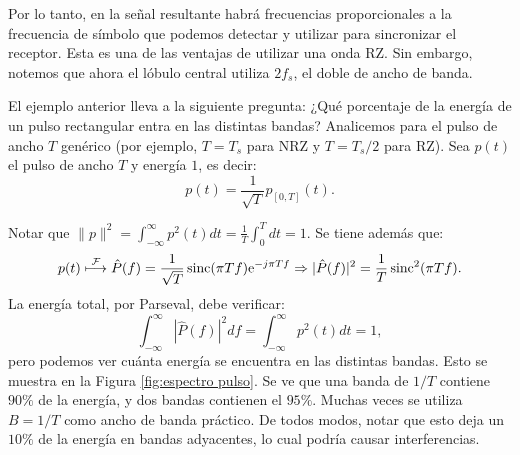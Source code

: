 \begin{ejemplo}
    Por lo tanto, en la señal resultante habrá frecuencias proporcionales a la frecuencia de símbolo que podemos detectar y utilizar para sincronizar el receptor. Esta es una de las ventajas de utilizar una onda RZ. Sin embargo, notemos que ahora el lóbulo central utiliza $2f_s$, el doble de ancho de banda.
\end{ejemplo}

El ejemplo anterior lleva a la siguiente pregunta: ¿Qué porcentaje de la energía de un pulso rectangular entra en las distintas bandas? Analicemos para el pulso de ancho $T$ genérico (por ejemplo, $T=T_s$ para NRZ y $T=T_s/2$ para RZ). Sea $p(t)$ el pulso de ancho $T$ y energía $1$, es decir:
\begin{equation*}
p(t) = \frac{1}{\sqrt{T}}p_{[0,T]}(t).
\end{equation*} 

Notar que $\|p\|^2 = \int_{-\infty}^\infty p^2(t) dt = \frac{1}{T} \int_0^T dt = 1$. Se tiene además que:
\begin{equation*}
    p(t) \;\displaystyle{\mathop{\longmapsto}^{\mathcal{F}}}\; \hat{P}(f) = \frac{1}{\sqrt{T}}\operatorname{sinc}(\pi T f) \mathrm{e}^{-j\pi T f} \Rightarrow |\hat{P}(f)|^2 = \frac{1}{T}\operatorname{sinc}^2(\pi T f).
\end{equation*}
La energía total, por Parseval, debe verificar:
\begin{equation*}
    \int_{-\infty}^\infty |\hat{P}(f)|^2 df = \int_{-\infty}^\infty p^2(t) dt = 1,
\end{equation*}
pero podemos ver cuánta energía se encuentra en las distintas bandas. Esto se muestra en la Figura \ref{fig:espectro pulso}. Se ve que una banda de $1/T$ contiene $90\%$ de la energía, y dos bandas contienen el $95 \%$. Muchas veces se utiliza $B=1/T$ como ancho de banda práctico. De todos modos, notar que esto deja un $10\%$ de la energía en bandas adyacentes, lo cual podría causar interferencias.

